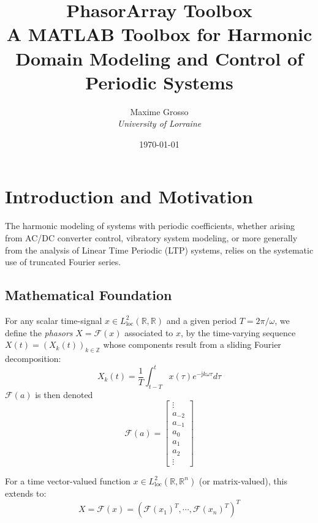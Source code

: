 \documentclass[11pt,a4paper]{article}
\title{\textbf{PhasorArray Toolbox}\\ 
\large A MATLAB Toolbox for Harmonic Domain Modeling and Control of Periodic Systems}
\author{Maxime Grosso\\
\textit{University of Lorraine}}
\date{\today}
\begin{document}
\maketitle

\tableofcontents
\clearpage

\section{Introduction and Motivation}

The harmonic modeling of systems with periodic coefficients, whether arising from AC/DC converter control, vibratory system modeling, or more generally from the analysis of Linear Time Periodic (LTP) systems, relies on the systematic use of truncated Fourier series.

\subsection{Mathematical Foundation}

For any scalar time-signal $x \in L^2_{\text{loc}}(\mathbb{R}, \mathbb{R})$ and a given period $T = 2\pi/\omega$, we define the \textit{phasors} $X = \mathcal{F}(x)$ associated to $x$, by the time-varying sequence $X(t) = (X_k(t))_{k \in \mathbb{Z}}$ whose components result from a sliding Fourier decomposition:
\begin{equation}
X_k(t) = \frac{1}{T}\int_{t-T}^{t} x(\tau)e^{-\mathrm{j}k\omega\tau} d\tau
\end{equation}
$\mathcal{F}(a)$ is then denoted 
\begin{equation}
    \mathcal{F}(a) = \begin{bmatrix}
    \vdots \\ 
    a_{-2} \\
    a_{-1} \\
    a_0 \\
    a_1 \\
    a_2 \\
    \vdots
    \end{bmatrix}
\end{equation}

For a time vector-valued function $x \in L^2_{\text{loc}}(\mathbb{R}, \mathbb{R}^n)$ (or matrix-valued), this extends to:
\begin{equation}
X = \mathcal{F}(x) = (\mathcal{F}(x_1)^T, \cdots, \mathcal{F}(x_n)^T)^T
\end{equation}
\end{document}
